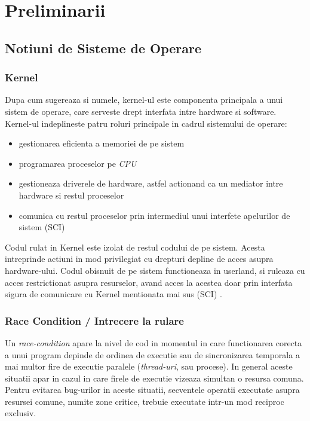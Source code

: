 \chapter{Preliminarii}

\section{Notiuni de Sisteme de Operare}

\subsection{Kernel}

Dupa cum sugereaza si numele, kernel-ul este componenta principala a unui
sistem de operare, care serveste drept interfata intre hardware si software.
Kernel-ul indeplineste patru roluri principale in cadrul sistemului de operare:

\begin{itemize}
  \setlength\itemsep{0em}
  \item gestionarea eficienta a memoriei de pe sistem
  \item programarea proceselor pe \emph{CPU}
  \item gestioneaza driverele de hardware, astfel actionand ca un mediator intre
    hardware si restul proceselor
  \item comunica cu restul proceselor prin intermediul unui interfete
    apelurilor de sistem (SCI)
\end{itemize}

Codul rulat in Kernel este izolat de restul codului de pe sistem. Acesta
intreprinde actiuni in mod privilegiat cu drepturi depline de acces asupra
hardware-ului. Codul obisnuit de pe sistem functioneaza in userland, si ruleaza
cu acces restrictionat asupra resurselor, avand acces la acestea doar prin
interfata sigura de comunicare cu Kernel mentionata mai sus (SCI)
\cite{kernel_redhat}.


\subsection{Race Condition / Intrecere la rulare}

Un \emph{race-condition} apare la nivel de cod in momentul in care functionarea
corecta a unui program depinde de ordinea de executie sau de sincronizarea
temporala a mai multor fire de executie paralele (\emph{thread-uri}, sau
procese). In general aceste situatii apar in cazul in care firele de executie
vizeaza simultan o resursa comuna. Pentru evitarea bug-urilor in aceste
situatii, secventele operatii executate asupra resursei comune, numite
zone critice, trebuie executate intr-un mod reciproc exclusiv.

